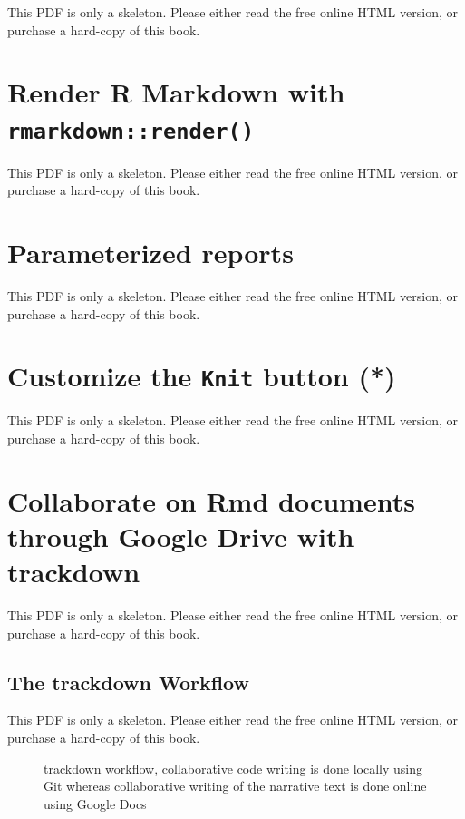 \documentclass[
  11pt,
]{krantz}
\begin{document}
This PDF is only a skeleton. Please either read the free online HTML version, or purchase a hard-copy of this book.

\section{\texorpdfstring{Render R Markdown with \texttt{rmarkdown::render()}}{Render R Markdown with rmarkdown::render()}}\label{rmarkdown-render}

This PDF is only a skeleton. Please either read the free online HTML version, or purchase a hard-copy of this book.

\section{Parameterized reports}\label{parameterized-reports}

This PDF is only a skeleton. Please either read the free online HTML version, or purchase a hard-copy of this book.

\section{\texorpdfstring{Customize the \texttt{Knit} button (*)}{Customize the Knit button (*)}}\label{custom-knit}

This PDF is only a skeleton. Please either read the free online HTML version, or purchase a hard-copy of this book.

\section{Collaborate on Rmd documents through Google Drive with trackdown}\label{google-drive}

This PDF is only a skeleton. Please either read the free online HTML version, or purchase a hard-copy of this book.

\subsection{The trackdown Workflow}\label{the-trackdown-workflow}

This PDF is only a skeleton. Please either read the free online HTML version, or purchase a hard-copy of this book.

\begin{figure}\caption{trackdown workflow, collaborative code writing is done locally using Git whereas collaborative writing of the narrative text is done online using Google Docs}\end{figure}
\end{document}
